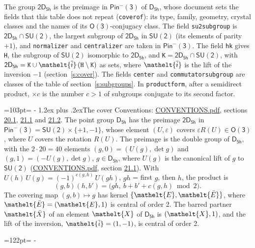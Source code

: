 \documentclass[10pt,a4paper]{article}
\makeatletter
\renewcommand\section{\@startsection{section}{1}{\z@}{-3ex plus -1ex minus -.2ex}%
  {1.2ex plus .2ex}{\normalfont\large\sffamily\bfseries\color{parttitle}}}
\newcommand{\needspace}[1]{\par\penalty-100\begingroup\dimen0=#1\relax\dimen2=\pagegoal
  \advance\dimen2-\pagetotal\ifdim\dimen0>\dimen2\relax\ifdim\dimen2>0pt\vfil\break\fi\fi
  \endgroup}
\numberwithin{equation}{section}
\newcommand{\eltfont}[1]{{\let\sigma\eltsigma\mathelt{#1}}}
\newcommand{\grp}[1]{\mathsf{#1}}
\newcommand{\elt}[1]{\eltfont{#1}}
\newcommand{\dirprod}{\times}
\newcommand{\barred}[1]{\bar{#1}}
\newcommand{\lift}[1]{\tilde{#1}}
\makeatother
\begin{document}
\leavevmode\label{n:element.inversion}\label{n:group.preimage}The group $\grp{2D_{5h}}$ is the preimage in $\grp{Pin^{-}(3)}$ of \href{../../../rotation/data/pdf/D5h.pdf}{$\grp{D_{5h}}$}, whose document sets the fields that this table does not repeat (\texttt{coverof}): its type, family, geometry, crystal classes and the names of its \href{../../../rotation/data/pdf/O3.pdf}{$\grp{O(3)}$}-conjugacy class. The field \texttt{su2subgroup} is $\grp{2D_{5h}} \cap \grp{SU(2)}$, the largest subgroup of $\grp{2D_{5h}}$ in $\grp{SU(2)}$ (its elements of parity $+1$), and \texttt{normalizer} and \texttt{centralizer} are taken in $\grp{Pin^{-}(3)}$. The field \texttt{hk} gives \texttt{H}, the subgroup of $\grp{SU(2)}$ isomorphic to $\grp{2D_{5h}}$, and \texttt{K}${} = \grp{2D_{5h}} \cap \grp{SU(2)}$, with $\grp{2D_{5h}} = \texttt{K} \cup \elt{\lift{i}}\,(\texttt{H} \setminus \texttt{K})$ as sets, where $\elt{\lift{i}}$ is the lift of the inversion $-1$ (section~\ref{s:cover}). The fields \texttt{center} and \texttt{commutatorsubgroup} are classes of the table of section~\ref{s:subgroups}.
\leavevmode\label{n:index.conjugates.c}In \texttt{productform}, after a semidirect product, ${\times}c$ is the number $c > 1$ of subgroups conjugate to its second factor.
\needspace{103pt}
\section{The cover}\label{s:cover}
Conventions: \href{../../CONVENTIONS.pdf}{CONVENTIONS.pdf}, sections \href{../../CONVENTIONS.pdf\#conv.20.1}{20.1}, \href{../../CONVENTIONS.pdf\#conv.21.1}{21.1} and \href{../../CONVENTIONS.pdf\#conv.21.2}{21.2}.
\leavevmode\label{n:group.pin.minus}\label{n:group.su2}\label{n:local.pin.sign}\label{n:matrix.covered}\label{n:matrix.lift.su2}\label{n:index.bar}The point group $\grp{D_{5h}}$ has the preimage $\grp{2D_{5h}}$ in $\grp{Pin^{-}(3)} = \grp{SU(2)} \dirprod \{+1, -1\}$, whose element $(U, \varepsilon)$ covers $\varepsilon R(U) \in \grp{O(3)}$, where $U$ covers the rotation $R(U)$. The preimage is the double group of $\grp{D_{5h}}$, with the $2 \cdot 20 = 40$ elements $(g, 0) = (U(g), \det g)$ and $(g, 1) = (-U(g), \det g)$, $g \in \grp{D_{5h}}$, where $U(g)$ is the canonical lift of $g$ to $\grp{SU(2)}$ (\href{../../CONVENTIONS.pdf}{CONVENTIONS.pdf}, section \href{../../CONVENTIONS.pdf\#conv.21.1}{21.1}). \label{n:function.cocycle}With $U(h)\,U(g) = (-1)^{c(g,h)}\,U(gh)$, $gh$ = first $g$, then $h$, the product is
\begin{equation}\label{e:product}(g, b)(h, b') = \bigl(gh,\ b + b' + c(g, h) \bmod 2\bigr).\end{equation}
\leavevmode\label{n:mark.bar}The covering map $(g, b) \mapsto g$ has kernel $\{\elt{E}, \elt{\barred{E}}\}$, where $\elt{\barred{E}} = (\elt{E}, 1)$ is central of order 2. \label{n:element.named}\label{n:mark.lift}The barred partner $\elt{\barred{X}}$ of an element $\elt{X}$ of $\grp{D_{5h}}$ is $(\elt{X}, 1)$, and the lift of the inversion, $\elt{\lift{i}} = (1, -1)$, is central of order 2.
\needspace{122pt}
\end{document}
